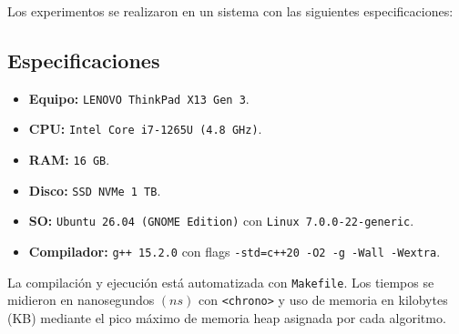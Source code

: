 Los experimentos se realizaron en un sistema con las siguientes especificaciones:

\subsection*{Especificaciones}
\begin{itemize}
  \item \textbf{Equipo:} \texttt{LENOVO ThinkPad X13 Gen 3}.
  \item \textbf{CPU:} \texttt{Intel Core i7-1265U (4.8 GHz)}.
  \item \textbf{RAM:} \texttt{16 GB}.
  \item \textbf{Disco:} \texttt{SSD NVMe 1 TB}.
  \item \textbf{SO:} \texttt{Ubuntu 26.04 (GNOME Edition)} con \texttt{Linux 7.0.0-22-generic}.
  \item \textbf{Compilador:} \texttt{g++ 15.2.0} con flags \texttt{-std=c++20 -O2 -g -Wall -Wextra}.
\end{itemize}

La compilación y ejecución está automatizada con \texttt{Makefile}. Los tiempos se midieron en nanosegundos $(ns)$ con \texttt{<chrono>} \parencite{cppreference_chrono} y uso de memoria en kilobytes (KB) mediante el pico máximo de memoria heap asignada por cada algoritmo. \parencite{so_memory_tracking_new_delete}